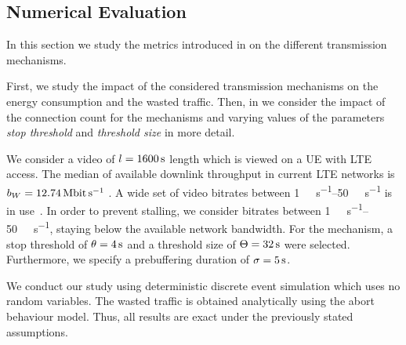 \subsection{Numerical Evaluation}\label{sec:application:lte_video:numerical_evaluation}

In this section we study the metrics introduced in  on the different transmission mechanisms.

First, we study the impact of the considered transmission mechanisms on the energy consumption and the wasted traffic. 
Then, in  we consider the impact of the connection count for the \streaming mechanisms and varying values of the parameters \emph{stop threshold} \bufferlower and \emph{threshold size} \buffersize in more detail.

We consider a video of \(l=\SI{1600}{\second}\) length which is viewed on a \gls{UE} with \gls{LTE} access.
The median of available downlink throughput in current \gls{LTE} networks is \(\bandwidth = \SI{12.74}{\mega\bit\per\second}\) \cite{Huang2012}.
A wide set of video bitrates between \SIrange{1}{50}{\mega\bit\per\second} is in use~\cite{YouTube2013}.
In order to prevent stalling, we consider bitrates between \SIrange{1}{50}{\mega\bit\per\second}, staying below the available network bandwidth.
For the \streaming mechanism, a stop threshold of \(\theta = \SI{4}{\second}\) and a threshold size of \(\Theta = \SI{32}{\second}\) were selected.
Furthermore, we specify a prebuffering duration of \(\sigma = \SI{5}{\second}\).

We conduct our study using deterministic discrete event simulation which uses no random variables.
The wasted traffic is obtained analytically using the abort behaviour model.
Thus, all results are exact under the previously stated assumptions.


